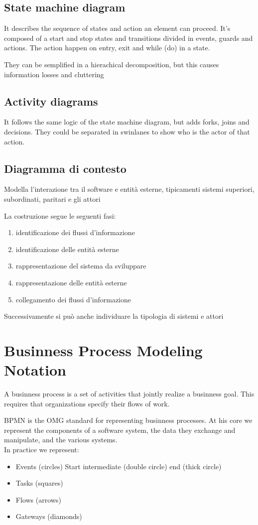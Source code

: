 \documentclass[12pt, a4paper]{article}
\begin{document}
\subsection{State machine diagram}
It describes the sequence of states and action an element can proceed. It's composed of a start and stop states and
transitions divided in events, guards and actions. The action happen on entry, exit and while (do) in a state.

They can be semplified in a hierachical decomposition, but this causes information losses and cluttering

\subsection{Activity diagrams}
It follows the same logic of the state machine diagram, but adds forks, joins and decisions. They could be
separated in swinlanes to show who is the actor of that action.

\subsection{Diagramma di contesto}
Modella l'interazione tra il software e entità esterne, tipicamenti sistemi superiori, subordinati, paritari e
gli attori

La costruzione segue le seguenti fasi:
\begin{enumerate}
    \item identificazione dei flussi d'informazione
    \item identificazione delle entità esterne
    \item rappresentazione del sistema da sviluppare
    \item rappresentazione delle entità esterne
    \item collegamento dei flussi d'informazione
\end{enumerate}
Successivamente si può anche individuare la tipologia di sistemi e attori

\section{Businness Process Modeling Notation}
A businness process is a set of activities that jointly realize a businness goal. This requires that organizations 
specify their flows of work.

BPMN is the OMG standard for representing businness processes. At his core we represent the components of a 
software system, the data they exchange and manipulate, and the various systems.\\ In practice we represent:
\begin{itemize}
    \item Events (circles)
    \subitem Start
    \subitem intermediate (double circle)
    \subitem end (thick circle)
    \item Tasks (squares)
    \item Flows (arrows)
    \item Gateways (diamonds)
\end{itemize}
\end{document}
